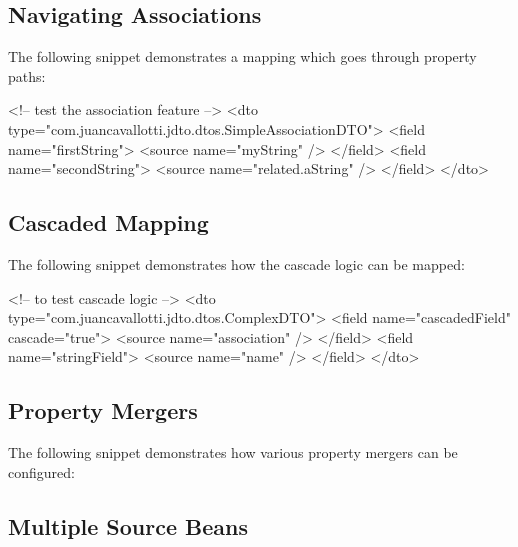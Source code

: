 \documentclass[11pt]{article}
\begin{document}
\subsection{Navigating Associations}

The following snippet demonstrates a mapping which goes through property paths:

\begin{xml}
<!-- test the association feature -->
<dto type="com.juancavallotti.jdto.dtos.SimpleAssociationDTO">
    <field name="firstString">
        <source name="myString" />
    </field>
    <field name="secondString">
        <source name="related.aString" />
    </field>
</dto>
\end{xml}

\subsection{Cascaded Mapping}

The following snippet demonstrates how the cascade logic can be mapped:

\begin{xml}
<!-- to test cascade logic -->
<dto type="com.juancavallotti.jdto.dtos.ComplexDTO">
    <field name="cascadedField" cascade="true">
        <source name="association" />
    </field>
    <field name="stringField">
        <source name="name" />
    </field>
</dto>
\end{xml}


\subsection{Property Mergers}

The following snippet demonstrates how various property mergers can be configured:


\subsection{Multiple Source Beans}
\end{document}

